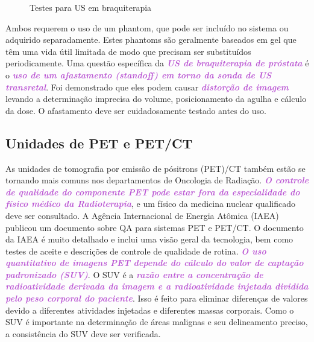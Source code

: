 \documentclass[11pt,a4paper]{article}
\begin{document}
	\begin{figure}[!h]
		\centering
		\caption{Testes para US em braquiterapia}
		\label{fig:qausbraq}
	\end{figure}

	Ambos requerem o uso de um phantom, que pode ser incluído no sistema ou adquirido separadamente. Estes phantoms são geralmente baseados em gel que têm uma vida útil limitada de modo que precisam ser substituídos periodicamente. Uma questão específica da \textcolor{MediumOrchid}{\textbf{\textit{US de braquiterapia de próstata}}} é o \textcolor{MediumOrchid}{\textbf{\textit{uso de um afastamento (standoff) em torno da sonda de US transretal}}}. Foi demonstrado que eles podem causar \textcolor{MediumOrchid}{\textbf{\textit{distorção de imagem}}} levando a determinação imprecisa do volume, posicionamento da agulha e cálculo da dose. O afastamento deve ser cuidadosamente testado antes do uso.

\subsection*{Unidades de PET e PET/CT}

	As unidades de tomografia por emissão de pósitrons (PET)/CT também estão se tornando mais comuns nos departamentos de Oncologia de Radiação. \textcolor{MediumOrchid}{\textbf{\textit{O controle de qualidade do componente PET pode estar fora da especialidade do físico médico da Radioterapia}}}, e um físico da medicina nuclear qualificado deve ser consultado. A Agência Internacional de Energia Atômica (IAEA) publicou um documento sobre QA para sistemas PET e PET/CT. O documento da IAEA é muito detalhado e inclui uma visão geral da tecnologia, bem como testes de aceite e descrições de controle de qualidade de rotina. \textcolor{MediumOrchid}{\textbf{\textit{O uso quantitativo de imagens PET depende do cálculo do valor de captação padronizado (SUV)}}}. O SUV é a \textcolor{MediumOrchid}{\textbf{\textit{razão entre a concentração de radioatividade derivada da imagem e a radioatividade injetada dividida pelo peso corporal do paciente}}}. Isso é feito para eliminar diferenças de valores devido a diferentes atividades injetadas e diferentes massas corporais. Como o SUV é importante na determinação de áreas malignas e seu delineamento preciso, a consistência do SUV deve ser verificada.
\end{document}
